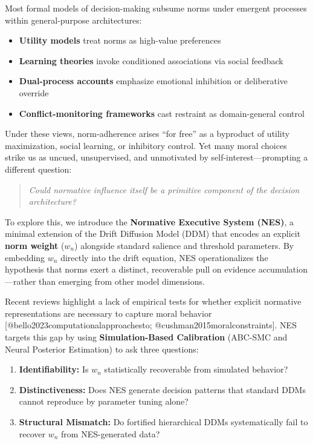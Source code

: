 \documentclass[
  11pt,
]{article}
\providecommand{\tightlist}{%
  \setlength{\itemsep}{0pt}\setlength{\parskip}{0pt}}
\begin{document}
Most formal models of decision-making subsume norms under emergent
processes within general-purpose architectures:

\begin{itemize}
\tightlist
\item
  \textbf{Utility models} treat norms as high-value preferences\\
\item
  \textbf{Learning theories} invoke conditioned associations via social
  feedback\\
\item
  \textbf{Dual-process accounts} emphasize emotional inhibition or
  deliberative override\\
\item
  \textbf{Conflict-monitoring frameworks} cast restraint as
  domain-general control
\end{itemize}

Under these views, norm-adherence arises ``for free'' as a byproduct of
utility maximization, social learning, or inhibitory control. Yet many
moral choices strike us as uncued, unsupervised, and unmotivated by
self-interest---prompting a different question:

\begin{quote}
\emph{Could normative influence itself be a primitive component of the
decision architecture?}
\end{quote}

To explore this, we introduce the \textbf{Normative Executive System
(NES)}, a minimal extension of the Drift Diffusion Model (DDM) that
encodes an explicit \textbf{norm weight} (\(w_n\)) alongside standard
salience and threshold parameters. By embedding \(w_n\) directly into
the drift equation, NES operationalizes the hypothesis that norms exert
a distinct, recoverable pull on evidence accumulation---rather than
emerging from other model dimensions.

Recent reviews highlight a lack of empirical tests for whether explicit
normative representations are necessary to capture moral behavior
{[}@bello2023computationalapproachesto; @cushman2015moralconstraints{]}.
NES targets this gap by using \textbf{Simulation-Based Calibration}
(ABC-SMC and Neural Posterior Estimation) to ask three questions:

\begin{enumerate}
\def\labelenumi{\arabic{enumi}.}
\tightlist
\item
  \textbf{Identifiability:} Is \(w_n\) statistically recoverable from
  simulated behavior?\\
\item
  \textbf{Distinctiveness:} Does NES generate decision patterns that
  standard DDMs cannot reproduce by parameter tuning alone?\\
\item
  \textbf{Structural Mismatch:} Do fortified hierarchical DDMs
  systematically fail to recover \(w_n\) from NES-generated data?
\end{enumerate}
\end{document}
